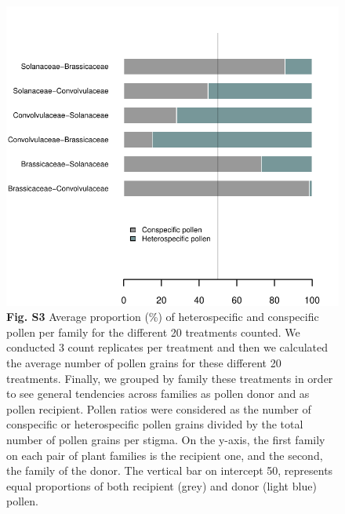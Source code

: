\documentclass[
  12pt,
]{article}
\begin{document}
\begin{figure}
\centering
\includegraphics{Supp_Material_files/figure-latex/unnamed-chunk-6-1.pdf}
\caption{\textbf{Fig. S3} Average proportion (\%) of heterospecific and
conspecific pollen per family for the different 20 treatments counted.
We conducted 3 count replicates per treatment and then we calculated the
average number of pollen grains for these different 20 treatments.
Finally, we grouped by family these treatments in order to see general
tendencies across families as pollen donor and as pollen recipient.
Pollen ratios were considered as the number of conspecific or
heterospecific pollen grains divided by the total number of pollen
grains per stigma. On the y-axis, the first family on each pair of plant
families is the recipient one, and the second, the family of the donor.
The vertical bar on intercept 50, represents equal proportions of both
recipient (grey) and donor (light blue) pollen.}
\end{figure}

\clearpage
\end{document}

